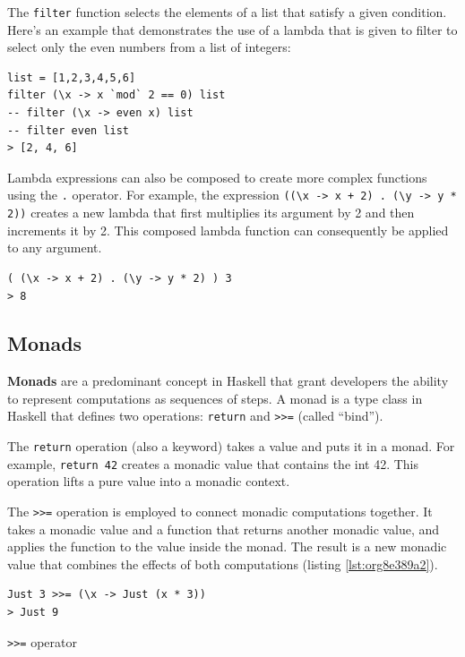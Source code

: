 \documentclass[a4paper, titlepage, twoside]{article}
\begin{document}
The \texttt{filter} function selects the elements of a list that satisfy a given condition. Here's an example that demonstrates the use of a lambda that is given to filter to select only the even numbers from a list of integers:

\begin{verbatim}
list = [1,2,3,4,5,6]
filter (\x -> x `mod` 2 == 0) list
-- filter (\x -> even x) list
-- filter even list
> [2, 4, 6]
\end{verbatim}

Lambda expressions can also be composed to create more complex functions using the \texttt{.} operator. For example, the expression \texttt{((\textbackslash{}x -> x + 2) . (\textbackslash{}y -> y * 2))} creates a new lambda that first multiplies its argument by 2 and then increments it by 2. This composed lambda function can consequently be applied to any argument.

\begin{verbatim}
( (\x -> x + 2) . (\y -> y * 2) ) 3
> 8
\end{verbatim}

\subsection{Monads}
\label{sec:orga430acd}

\textbf{Monads} are a predominant concept in Haskell that grant developers the ability to represent computations as sequences of steps. A monad is a type class in Haskell that defines two operations: \texttt{return} and \texttt{>{}>{}=} (called ``bind'').

The \texttt{return} operation (also a keyword) takes a value and puts it in a monad. For example, \texttt{return 42} creates a monadic value that contains the int 42. This operation lifts a pure value into a monadic context.

The \texttt{>{}>{}=} operation is employed to connect monadic computations together. It takes a monadic value and a function that returns another monadic value, and applies the function to the value inside the monad. The result is a new monadic value that combines the effects of both computations (listing \ref{lst:org8e389a2}).

\begin{listing}[htbp]
\begin{verbatim}
Just 3 >>= (\x -> Just (x * 3)) 
> Just 9
\end{verbatim}
\caption{\label{lst:org8e389a2}\texttt{>{}>{}=} operator}
\end{listing}
\end{document}
